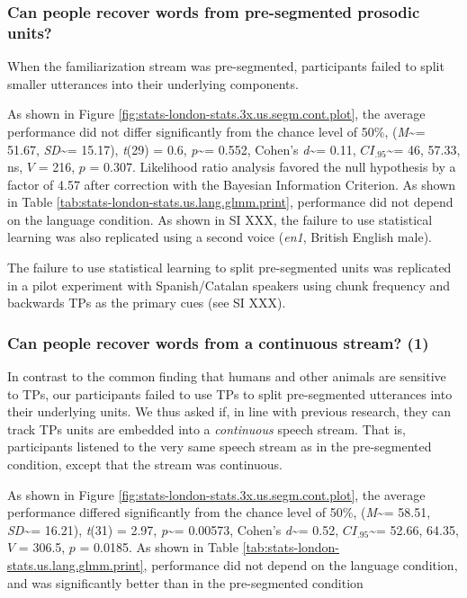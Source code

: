 \documentclass[
]{article}
\newcommand{\T}{{\em t\/}}
\newcommand{\p}{{\em p\/}}
\newcommand{\M}{{\em M\/}}
\newcommand{\SD}{{\em SD\/}}
\newcommand{\D}{Cohen's {\em d\/}}
\newcommand{\CI}{$CI_{.95}$}
\begin{document}
\subsubsection{Can people recover words from pre-segmented prosodic
units?}\label{can-people-recover-words-from-pre-segmented-prosodic-units}

When the familiarization stream was pre-segmented, participants failed
to split smaller utterances into their underlying components.

As shown in Figure \ref{fig:stats-london-stats.3x.us.segm.cont.plot},
the average performance did not differ significantly from the chance
level of 50\%, (\M\textasciitilde= 51.67, \SD\textasciitilde= 15.17),
\T(29) = 0.6, \p\textasciitilde= 0.552, \D\textasciitilde= 0.11,
\CI\textasciitilde= 46, 57.33, ns, \(V\) = 216, \(p\) = 0.307.
Likelihood ratio analysis favored the null hypothesis by a factor of
4.57 after correction with the Bayesian Information Criterion. As shown
in Table \ref{tab:stats-london-stats.us.lang.glmm.print}, performance
did not depend on the language condition. As shown in SI XXX, the
failure to use statistical learning was also replicated using a second
voice (\emph{en1}, British English male).

The failure to use statistical learning to split pre-segmented units was
replicated in a pilot experiment with Spanish/Catalan speakers using
chunk frequency and backwards TPs as the primary cues (see SI XXX).

\subsubsection{Can people recover words from a continuous stream?
(1)}\label{can-people-recover-words-from-a-continuous-stream-1}

In contrast to the common finding that humans and other animals are
sensitive to TPs, our participants failed to use TPs to split
pre-segmented utterances into their underlying units. We thus asked if,
in line with previous research, they can track TPs units are embedded
into a \emph{continuous} speech stream. That is, participants listened
to the very same speech stream as in the pre-segmented condition, except
that the stream was continuous.

As shown in Figure \ref{fig:stats-london-stats.3x.us.segm.cont.plot},
the average performance differed significantly from the chance level of
50\%, (\M\textasciitilde= 58.51, \SD\textasciitilde= 16.21), \T(31) =
2.97, \p\textasciitilde= 0.00573, \D\textasciitilde= 0.52,
\CI\textasciitilde= 52.66, 64.35, \(V\) = 306.5, \(p\) = 0.0185. As
shown in Table \ref{tab:stats-london-stats.us.lang.glmm.print},
performance did not depend on the language condition, and was
significantly better than in the pre-segmented condition
\end{document}
